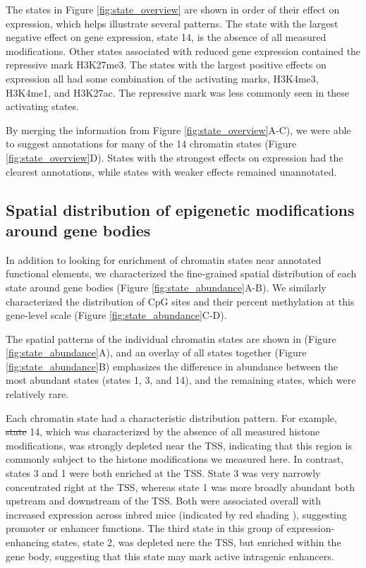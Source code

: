 \documentclass[10pt,letterpaper]{article}
\providecommand{\DIFaddtex}[1]{{\protect\color{blue}\uwave{#1}}} %
\providecommand{\DIFdeltex}[1]{{\protect\color{red}\sout{#1}}}                      %
\providecommand{\DIFaddbegin}{} %
\providecommand{\DIFaddend}{} %
\providecommand{\DIFdelbegin}{} %
\providecommand{\DIFdelend}{} %
\providecommand{\DIFadd}[1]{\texorpdfstring{\DIFaddtex{#1}}{#1}} %
\providecommand{\DIFdel}[1]{\texorpdfstring{\DIFdeltex{#1}}{}} %
\newcommand{\DIFscaledelfig}{0.5}
\newlength{\DIFdelgraphicswidth} %
\newlength{\DIFdelgraphicsheight} %
\newcommand{\DIFaddincludegraphics}[2][]{{\color{blue}\fbox{\DIFOincludegraphics[#1]{#2}}}} %
\newcommand{\DIFdelincludegraphics}[2][]{%
\sbox{\DIFdelgraphicsbox}{\DIFOincludegraphics[#1]{#2}}%
\settoboxwidth{\DIFdelgraphicswidth}{\DIFdelgraphicsbox} %
\settoboxtotalheight{\DIFdelgraphicsheight}{\DIFdelgraphicsbox} %
\scalebox{\DIFscaledelfig}{%
\parbox[b]{\DIFdelgraphicswidth}{\usebox{\DIFdelgraphicsbox}\\[-\baselineskip] \rule{\DIFdelgraphicswidth}{0em}}\llap{\resizebox{\DIFdelgraphicswidth}{\DIFdelgraphicsheight}{%
\setlength{\unitlength}{\DIFdelgraphicswidth}%
\begin{picture}(1,1)%
\thicklines\linethickness{2pt} %
{\color[rgb]{1,0,0}\put(0,0){\framebox(1,1){}}}%
{\color[rgb]{1,0,0}\put(0,0){\line( 1,1){1}}}%
{\color[rgb]{1,0,0}\put(0,1){\line(1,-1){1}}}%
\end{picture}%
}\hspace*{3pt}}} %
} %
\DeclareRobustCommand{\DIFaddbegin}{\DIFOaddbegin \let\includegraphics\DIFaddincludegraphics} %
\DeclareRobustCommand{\DIFaddend}{\DIFOaddend \let\includegraphics\DIFOincludegraphics} %
\DeclareRobustCommand{\DIFdelbegin}{\DIFOdelbegin \let\includegraphics\DIFdelincludegraphics} %
\DeclareRobustCommand{\DIFdelend}{\DIFOaddend \let\includegraphics\DIFOincludegraphics} %
\begin{document}
The states in Figure \ref{fig:state_overview} are shown in order of
their effect on expression, which helps illustrate several patterns. The
state with the largest negative effect on gene expression, state 14, is
the absence of all measured modifications. Other states associated with
reduced gene expression contained the repressive mark H3K27me3. The
states with the largest positive effects on expression all had some
combination of the activating marks, H3K4me3, H3K4me1, and H3K27ac. The
repressive mark was less commonly seen in these activating states.

By merging the information from Figure \ref{fig:state_overview}A-C), we
were able to suggest annotations for many of the 14 chromatin states
(Figure \ref{fig:state_overview}D). States with the strongest effects on
expression had the clearest annotations, while states with weaker
effects remained unannotated.

\hypertarget{spatial-distribution-of-epigenetic-modifications-around-gene-bodies}{%
\subsection{Spatial distribution of epigenetic modifications around gene
bodies}\label{spatial-distribution-of-epigenetic-modifications-around-gene-bodies}}

In addition to looking for enrichment of chromatin states near annotated
functional elements, we characterized the fine-grained spatial
distribution of each state around gene bodies (Figure
\ref{fig:state_abundance}A-B). We similarly characterized the
distribution of CpG sites and their percent methylation at this
gene-level scale (Figure \ref{fig:state_abundance}C-D).

The spatial patterns of the individual chromatin states are shown in
(Figure \ref{fig:state_abundance}A), and an overlay of all states
together (Figure \ref{fig:state_abundance}B) emphasizes the difference
in abundance between the most abundant states (states 1, 3, and 14), and
the remaining states, which were relatively rare.

Each chromatin state had a characteristic distribution pattern. For
example, \DIFdelbegin \DIFdel{state }\DIFdelend \DIFaddbegin \DIFadd{State }\DIFaddend 14, which was characterized by the absence of all
measured histone modifications, was strongly depleted near the TSS,
indicating that this region is commonly subject to the histone
modifications we measured here. In contrast, states 3 and 1 were both
enriched at the TSS. State 3 was very narrowly concentrated right at the
TSS, whereas state 1 was more broadly abundant both upstream and
downstream of the TSS. Both were associated overall with increased
expression across inbred mice (indicated by red shading \DIFaddbegin \DIFadd{in Figure
\ref{fig:state_abundance}}\DIFaddend ), suggesting promoter or enhancer functions.
The third state in this group of expression-enhancing states, state 2,
was depleted nere the TSS, but enriched within the gene body, suggesting
that this state may mark active intragenic enhancers.
\end{document}

